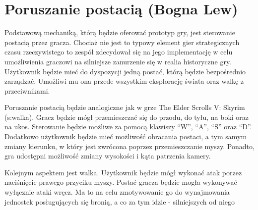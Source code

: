 \section{Poruszanie postacią (Bogna Lew)}
Podstawową mechaniką, którą będzie oferować prototyp gry, jest sterowanie postacią przez gracza. Chociaż nie jest
to typowy element gier strategicznych czasu rzeczywistego to zespół zdecydował się na jego implementację w celu umożliwienia
graczowi na silniejsze zanurzenie się w realia historyczne gry. Użytkownik będzie
mieć do dyspozycji jedną postać, którą będzie bezpośrednio zarządzać. Umożliwi mu ona przede wszystkim eksplorację
świata oraz walkę z przeciwnikami.

Poruszanie postacią będzie analogiczne jak w grze The Elder Scrolls V: Skyrim \por(s:walka). Gracz będzie mógł przemieszczać się
do przodu, do tyłu, na boki oraz na ukos. Sterowanie będzie możliwe za pomocą klawiszy  “W”, “A”, “S” oraz “D”.
Dodatkowo użytkownik będzie mieć możliwość obracania postaci, a tym samym zmiany kierunku, w który jest zwrócona poprzez
przemieszczanie myszy. Ponadto, gra udostępni możliwość zmiany wysokości i kąta patrzenia kamery.

Kolejnym aspektem jest walka. Użytkownik będzie mógł wykonać atak porzez naciśnięcie prawego przyciku myszy. Postać
gracza będzie mogła wykonywać wyłącznie ataki wręcz. Ma to na celu zmotywowanie go do wynajmowania jednostek posługujących
się bronią, a co za tym idzie - silniejszych od niego